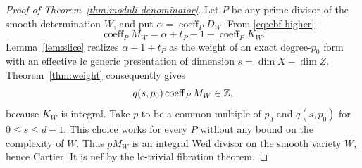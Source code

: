 \begin{proof}[Proof of Theorem~\ref{thm:moduli-denominator}]
Let $P$ be any prime divisor of the smooth determination $W$, and put
$\alpha=\operatorname{coeff}_P D_W$.  From
\eqref{eq:cbf-higher},
\[
 \operatorname{coeff}_P M_W
   =\alpha+t_P-1-\operatorname{coeff}_P K_W.
\]
Lemma~\ref{lem:slice} realizes $\alpha-1+t_P$ as the weight of an
exact degree-$p_0$ form with an effective lc generic presentation of
dimension $s=\dim X-\dim Z$.  Theorem~\ref{thm:weight} consequently
gives
\[
 q(s,p_0)\operatorname{coeff}_P M_W\in\mathbb Z,
\]
because $K_W$ is integral.  Take $p$ to be a common multiple of $p_0$
and $q(s,p_0)$ for $0\leq s\leq d-1$.  This choice works for every
$P$ without any bound on the complexity of $W$.  Thus $pM_W$ is an
integral Weil divisor on the smooth variety $W$, hence Cartier.
It is nef by the lc-trivial fibration theorem.
\end{proof}
